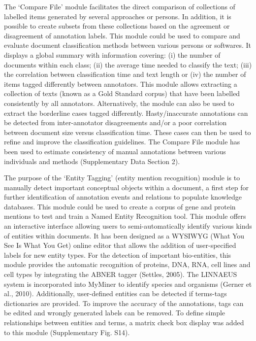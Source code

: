 \begin{description}
    The ‘Compare File’ module facilitates the direct comparison of collections of labelled items generated by several approaches or persons. In addition, it is possible to create subsets from these collections based on the agreement or disagreement of annotation labels. This module could be used to compare and evaluate document classification methods between various persons or softwares. It displays a global summary with information covering: (i) the number of documents within each class; (ii) the average time needed to classify the text; (iii) the correlation between classification time and text length or (iv) the number of items tagged differently between annotators. This module allows extracting a collection of texts (known as a Gold Standard corpus) that have been labelled consistently by all annotators. Alternatively, the module can also be used to extract the borderline cases tagged differently. Hasty/inaccurate annotations can be detected from inter-annotator disagreements and/or a poor correlation between document size versus classification time. These cases can then be used to refine and improve the classification guidelines. The Compare File module has been used to estimate consistency of manual annotations between various individuals and methods (Supplementary Data Section 2).

    The purpose of the ‘Entity Tagging’ (entity mention recognition) module is to manually detect important conceptual objects within a document, a first step for further identification of annotation events and relations to populate knowledge databases. This module could be used to create a corpus of gene and protein mentions to test and train a Named Entity Recognition tool. This module offers an interactive interface allowing users to semi-automatically identify various kinds of entities within documents. It has been designed as a WYSIWYG (What You See Is What You Get) online editor that allows the addition of user-specified labels for new entity types. For the detection of important bio-entities, this module provides the automatic recognition of proteins, DNA, RNA, cell lines and cell types by integrating the ABNER tagger (Settles, 2005). The LINNAEUS system is incorporated into MyMiner to identify species and organisms (Gerner et al., 2010). Additionally, user-defined entities can be detected if terms-tags dictionaries are provided. To improve the accuracy of the annotations, tags can be edited and wrongly generated labels can be removed. To define simple relationships between entities and terms, a matrix check box display was added to this module (Supplementary Fig. S14).


\end{description}
